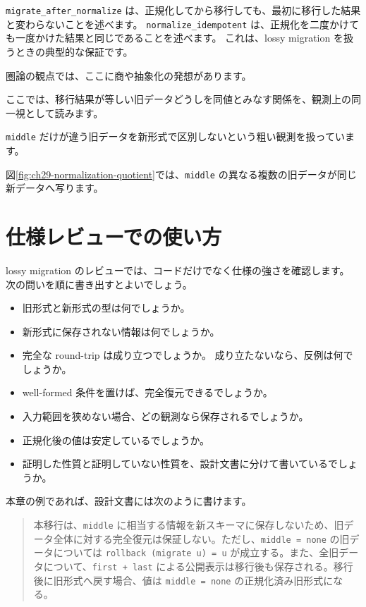 \texttt{migrate\_after\_normalize} は、正規化してから移行しても、最初に移行した結果と変わらないことを述べます。
\texttt{normalize\_idempotent} は、正規化を二度かけても一度かけた結果と同じであることを述べます。
これは、lossy migration を扱うときの典型的な保証です。

圏論の観点では、ここに商や抽象化の発想があります。

ここでは、移行結果が等しい旧データどうしを同値とみなす関係を、観測上の同一視として読みます。

\texttt{middle} だけが違う旧データを新形式で区別しないという粗い観測を扱っています。

図\ref{fig:ch29-normalization-quotient}では、\texttt{middle} の異なる複数の旧データが同じ新データへ写ります。


\section{仕様レビューでの使い方}

lossy migration のレビューでは、コードだけでなく仕様の強さを確認します。
次の問いを順に書き出すとよいでしょう。

\begin{itemize}
\item 旧形式と新形式の型は何でしょうか。
\item 新形式に保存されない情報は何でしょうか。
\item 完全な round-trip は成り立つでしょうか。
成り立たないなら、反例は何でしょうか。
\item well-formed 条件を置けば、完全復元できるでしょうか。
\item 入力範囲を狭めない場合、どの観測なら保存されるでしょうか。
\item 正規化後の値は安定しているでしょうか。
\item 証明した性質と証明していない性質を、設計文書に分けて書いているでしょうか。
\end{itemize}

本章の例であれば、設計文書には次のように書けます。

\begin{quote}
本移行は、\texttt{middle} に相当する情報を新スキーマに保存しないため、旧データ全体に対する完全復元は保証しない。ただし、\texttt{middle = none} の旧データについては \texttt{rollback (migrate u) = u} が成立する。また、全旧データについて、\texttt{first + last} による公開表示は移行後も保存される。移行後に旧形式へ戻す場合、値は \texttt{middle = none} の正規化済み旧形式になる。
\end{quote}

